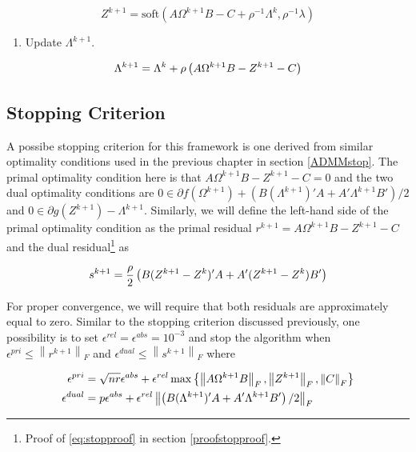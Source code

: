 \documentclass[11pt,]{report}
\providecommand{\tightlist}{%
  \setlength{\itemsep}{0pt}\setlength{\parskip}{0pt}}
\theoremstyle{definition}
\theoremstyle{definition}
\theoremstyle{definition}
\theoremstyle{remark}
\begin{document}
\begin{equation}
Z^{k + 1} = \mbox{soft}\left( A\Omega^{k + 1}B - C + \rho^{-1}\Lambda^{k}, \rho^{-1}\lambda \right)
\label{eq:Zk}
\end{equation}

\begin{enumerate}
\def\labelenumi{\arabic{enumi}.}
\setcounter{enumi}{4}
\tightlist
\item
  Update \(\Lambda^{k + 1}\).
\end{enumerate}

\begin{equation}
\Lambda^{k + 1} = \Lambda^{k} + \rho\left( A\Omega^{k + 1} B - Z^{k + 1} - C \right)
\label{eq:Yk}\notag
\end{equation}

\hypertarget{stopping-criterion}{%
\subsection{Stopping Criterion}\label{stopping-criterion}}

A possibe stopping criterion for this framework is one derived from similar optimality conditions used in the previous chapter in section \ref{ADMMstop}. The primal optimality condition here is that \(A\Omega^{k + 1}B - Z^{k + 1} - C = 0\) and the two dual optimality conditions are \(0 \in \partial f\left(\Omega^{k + 1}\right) + \left(B(\Lambda^{k + 1})'A + A'\Lambda^{k + 1}B' \right)/2\) and \(0 \in \partial g\left(Z^{k + 1}\right) - \Lambda^{k + 1}\). Similarly, we will define the left-hand side of the primal optimality condition as the primal residual \(r^{k + 1} = A\Omega^{k + 1}B - Z^{k + 1} - C\) and the dual residual\footnote{Proof of \eqref{eq:stopproof} in section \ref{proofstopproof}.} as

\begin{equation}
s^{k + 1} = \frac{\rho}{2}\left( B(Z^{k + 1} - Z^{k})'A + A'(Z^{k + 1} - Z^{k})B' \right)
\label{eq:stopproof}\notag
\end{equation}

For proper convergence, we will require that both residuals are approximately equal to zero. Similar to the stopping criterion discussed previously, one possibility is to set \(\epsilon^{rel} = \epsilon^{abs} = 10^{-3}\) and stop the algorithm when \(\epsilon^{pri} \leq \left\| r^{k + 1} \right\|_{F}\) and \(\epsilon^{dual} \leq \left\| s^{k + 1} \right\|_{F}\) where

\begin{equation}
\begin{split}
  \epsilon^{pri} &= \sqrt{nr}\epsilon^{abs} + \epsilon^{rel}\max\left\{ \left\| A\Omega^{k + 1}B \right\|_{F}, \left\| Z^{k + 1} \right\|_{F}, \left\| C \right\|_{F} \right\} \\
  \epsilon^{dual} &= p\epsilon^{abs} + \epsilon^{rel}\left\| \left( B(\Lambda^{k + 1})'A + A'\Lambda^{k + 1}B' \right)/2 \right\|_{F}
\end{split}
\label{eq:scpmestopping}\notag
\end{equation}
\end{document}
